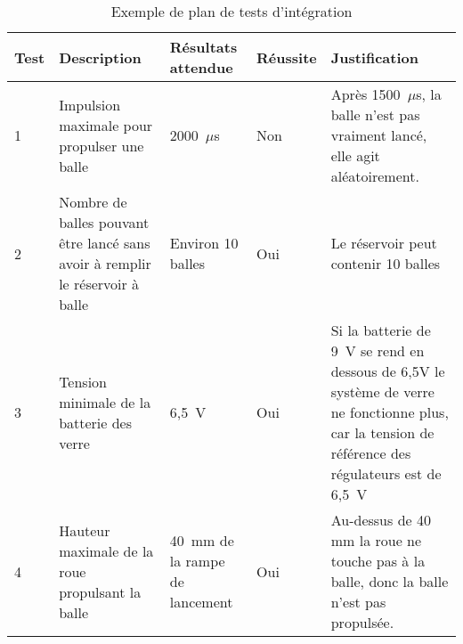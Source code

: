\begin{table}[h!]
    \centering
    \begin{tabular}{p{0.25in}p{1.5in}p{1.5in}p{0.5in}p{1.5in}}
        \hline
        \bfseries Test & \bfseries Description & \bfseries Résultats attendue & \bfseries Réussite & \bfseries Justification \\
        \hline\hline
        1 & Impulsion maximale pour propulser une balle & 2000~$\mu$s & Non & Après 1500~$\mu$s, la balle n’est pas vraiment lancé, elle agit aléatoirement. \\
        2 & Nombre de balles pouvant être lancé sans avoir à remplir le réservoir à balle & Environ 10 balles & Oui & Le réservoir peut contenir 10 balles \\
        3 & Tension minimale de la batterie des verre & 6,5~V & Oui & Si la batterie de 9~V se rend en dessous de 6,5V le système de verre ne fonctionne plus, car la tension de référence des régulateurs est de 6,5~V \\
        4 & Hauteur maximale de la roue propulsant la balle & 40~mm de la rampe de lancement & Oui & Au-dessus de 40 mm la roue ne touche pas à la balle, donc la balle n’est pas propulsée. \\
        \hline
    \end{tabular}
    \caption{Exemple de plan de tests d'intégration}
    \label{tab:s3-test-integration}
\end{table}
